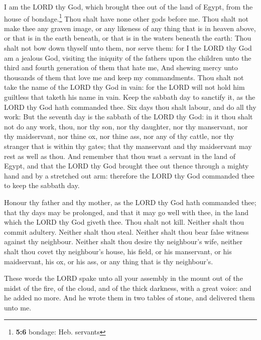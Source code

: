  I am the LORD thy God, which brought thee out of the land
of Egypt, from the house of bondage.\footnote{\textbf{5:6} bondage: Heb.
  servants}  Thou shalt have none other gods before me.
 Thou shalt not make thee any graven image, or any
likeness of any thing that is in heaven above, or that is in the earth
beneath, or that is in the waters beneath the earth:  Thou
shalt not bow down thyself unto them, nor serve them: for I the LORD thy
God am a jealous God, visiting the iniquity of the fathers upon the
children unto the third and fourth generation of them that hate me,
 And shewing mercy unto thousands of them that love me
and keep my commandments.  Thou shalt not take the name
of the LORD thy God in vain: for the LORD will not hold him guiltless
that taketh his name in vain.  Keep the sabbath day to
sanctify it, as the LORD thy God hath commanded thee. 
Six days thou shalt labour, and do all thy work:  But the
seventh day is the sabbath of the LORD thy God: in it thou shalt not do
any work, thou, nor thy son, nor thy daughter, nor thy manservant, nor
thy maidservant, nor thine ox, nor thine ass, nor any of thy cattle, nor
thy stranger that is within thy gates; that thy manservant and thy
maidservant may rest as well as thou.  And remember that
thou wast a servant in the land of Egypt, and that the LORD thy God
brought thee out thence through a mighty hand and by a stretched out
arm: therefore the LORD thy God commanded thee to keep the sabbath day.

 Honour thy father and thy mother, as the LORD thy God
hath commanded thee; that thy days may be prolonged, and that it may go
well with thee, in the land which the LORD thy God giveth thee.
 Thou shalt not kill.  Neither shalt thou
commit adultery.  Neither shalt thou steal.
 Neither shalt thou bear false witness against thy
neighbour.  Neither shalt thou desire thy neighbour's
wife, neither shalt thou covet thy neighbour's house, his field, or his
manservant, or his maidservant, his ox, or his ass, or any thing that is
thy neighbour's.

 These words the LORD spake unto all your assembly in the
mount out of the midst of the fire, of the cloud, and of the thick
darkness, with a great voice: and he added no more. And he wrote them in
two tables of stone, and delivered them unto me.

